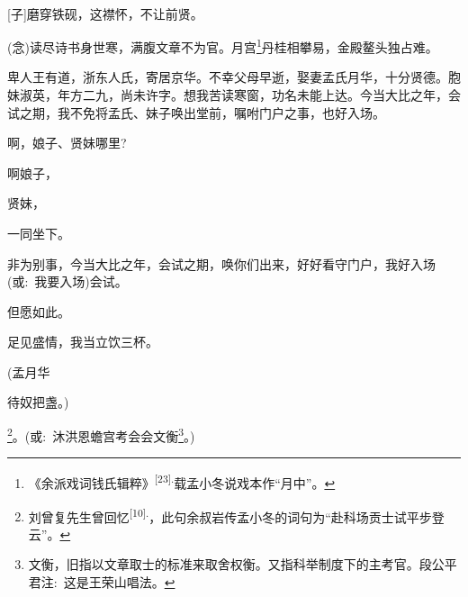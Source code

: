 \newpage\hspace{30pt}~

{%

\subsubsection{\large{}}

{\vspace{5pt}}

{{[}{子}{]}磨穿铁砚，这襟怀，不让前贤。}

{({\akai 念})读尽诗书身世寒，满腹文章不为官。月宫}\footnote{《余派戏词钱氏辑粹》\textsuperscript{{[}23{]}.}载孟小冬说戏本作``月中''。}{丹桂相攀易，金殿鳌头独占难。}

{卑人王有道，浙东人氏，寄居京华。不幸父母早逝，娶妻孟氏月华，十分贤德。胞妹淑英，年方二九，尚未许字。想我苦读寒窗，功名未能上达。今当大比之年，会试之期，我不免将孟氏、妹子唤出堂前，嘱咐门户之事，也好入场。}

{啊，娘子、贤妹哪里?}\hspace{10pt}~

{啊娘子，}\hspace{30pt}~

{贤妹，}\hspace{40pt}~

{一同坐下。}\hspace{30pt}~

{非为别事，今当大比之年，会试之期，唤你们出来，好好看守门户，我好入场({\akai 或}:~我要入场)会试。}

{但愿如此。}\hspace{30pt}~

{足见盛情，我当立饮三杯。}\hspace{10pt}~

{(孟月华\hspace{40pt}~

待奴把盏。)}




\footnote{刘曾复先生曾回忆\textsuperscript{{[}10{]}.}，此句余叔岩传孟小冬的词句为``赴科场贡士试平步登云''。}{。({\akai 或}:~沐洪恩蟾宫考会会文衡}\footnote{文衡，旧指以文章取士的标准来取舍权衡。又指科举制度下的主考官。段公平君注:~这是王荣山唱法。}{。)}

}
